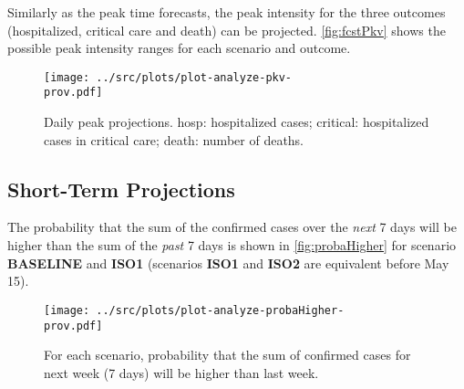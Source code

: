 \documentclass[10pt]{article}
\newcommand{\scen}[1]{\textbf{\textsf{#1}}}
\begin{document}
Similarly as the peak time forecasts, the peak intensity for the three outcomes (hospitalized, critical care and death) can be projected. \autoref{fig:fcstPkv} shows the possible peak intensity ranges for each scenario and outcome.

\begin{figure}[h!]
\begin{center}
\texttt{[image: ../src/plots/plot-analyze-pkv-\\prov.pdf]}
\caption{Daily peak projections. \textsf{hosp}: hospitalized cases; \textsf{critical}: hospitalized cases in critical care; \textsf{death}: number of deaths.}
\label{fig:fcstPkv}
\end{center}
\end{figure}




\newpage

\subsection*{Short-Term Projections}

The probability that the sum of the confirmed cases over the \emph{next} 7 days will be higher than the sum of the \emph{past} 7 days is shown in \autoref{fig:probaHigher} for  scenario \scen{BASELINE} and \scen{ISO1} (scenarios \scen{ISO1} and \scen{ISO2} are equivalent before May 15).

\begin{figure}[h!]
\begin{center}
\texttt{[image: ../src/plots/plot-analyze-probaHigher-\\prov.pdf]}
\caption{For each scenario, probability that the sum of confirmed cases for next week (7 days) will be higher than last week. }
\label{fig:probaHigher}
\end{center}
\end{figure}
\end{document}
